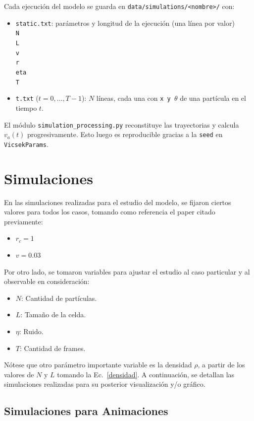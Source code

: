 \documentclass[12pt,a4paper]{article}
\begin{document}
Cada ejecución del modelo se guarda en \texttt{data/simulations/<nombre>/} con:
\begin{itemize}
  \item \texttt{static.txt}: parámetros y longitud de la ejecución (una línea por valor)\\
\texttt{\small N\\L\\v\\r\\eta\\T}
  \item \texttt{t.txt} (\(t=0,\dots,T-1\)): $N$ líneas, cada una con \texttt{x\ y\ \(\theta\)} de una partícula en el tiempo $t$.
\end{itemize}

El módulo \texttt{simulation\_processing.py} reconstituye las trayectorias y calcula $v_a(t)$ progresivamente. Esto luego es reproducible gracias a la \texttt{seed} en \texttt{VicsekParams}.

\section{Simulaciones}

En las simulaciones realizadas para el estudio del modelo, se fijaron ciertos valores para todos los casos, tomando como referencia el paper citado previamente:
\begin{itemize}
    \item $r_c = 1$
    \item $v = 0.03$
\end{itemize}

Por otro lado, se tomaron variables para ajustar el estudio al caso particular y al observable en consideración:
\begin{itemize}
    \item $N$: Cantidad de partículas.
    \item $L$: Tamaño de la celda.
    \item $\eta$: Ruido.
    \item $T$: Cantidad de frames.
\end{itemize}

Nótese que otro parámetro importante variable es la densidad $\rho$, a partir de los valores de $N$ y $L$ tomando la Ec.~\eqref{densidad}. A continuación, se detallan las simulaciones realizadas para su posterior visualización y/o gráfico.

\subsection{Simulaciones para Animaciones}
\label{simulaciones-para-animaciones}
\end{document}
